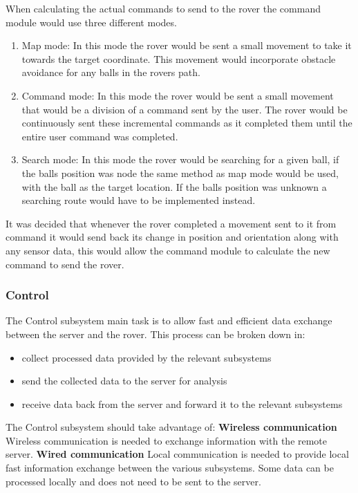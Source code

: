 \documentclass[10pt,twoside]{article}
\begin{document}
\smallbreak
When calculating the actual commands to send to the rover the command module would use three different modes.
\begin{enumerate}
  \item Map mode: In this mode the rover would be sent a small movement to take it towards the target coordinate. This movement would incorporate obstacle avoidance for any balls in the rovers path.
  \item Command mode: In this mode the rover would be sent a small movement that would be a division of a command sent by the user. The rover would be continuously sent these incremental commands as it completed them until the entire user command was completed.
  \item Search mode: In this mode the rover would be searching for a given ball, if the balls position was node the same method as map mode would be used, with the ball as the target location. If the balls position was unknown a searching route would have to be implemented instead.
\end{enumerate}
It was decided that whenever the rover completed a movement sent to it from command it would send back its change in position and orientation along with any sensor data, this would allow the command module to calculate the new command to send the rover.

\newpage
\subsubsection{Control}

The Control subsystem main task is to allow fast and efficient data exchange between the server and the rover. This process can be broken down in:
\begin{itemize}
    \item collect processed data provided by the relevant subsystems
    \item send the collected data to the server for analysis
    \item receive data back from the server and forward it to the relevant subsystems
\end{itemize}

The Control subsystem should take advantage of: \newline
\smallskip
\textbf{Wireless communication} Wireless communication is needed to exchange information with the remote server. \newline
\smallskip
\textbf{Wired communication} Local communication is needed to provide local fast information exchange between the various subsystems. Some data can be processed locally and does not need to be sent to the server.
\end{document}
